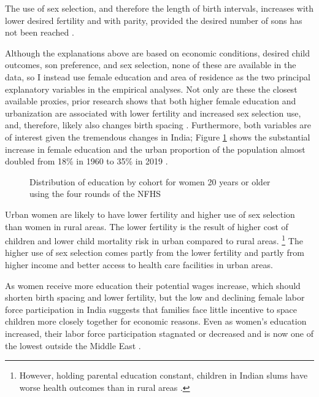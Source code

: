 \documentclass[12pt,letterpaper]{article}
\begin{document}
The use of sex selection, and therefore the length of birth intervals, increases with
lower desired fertility and with parity, provided the desired number of sons has 
not been reached \citep{Portner2015b,Jayachandran2017}.  

Although the explanations above are based on economic conditions, desired child outcomes,
son preference, and sex selection, none of these are available in the data, so I instead 
use female education and area of residence as the two principal explanatory variables in 
the empirical analyses.
Not only are these the closest available proxies, prior research shows that both higher 
female education and urbanization are associated with lower fertility and increased 
sex selection use, and, therefore, likely also changes birth spacing
\citep{das_gupta97,dreze01,bhat03,retherford03b,Guilmoto2009a,Portner2015b,Jayachandran2017}.
Furthermore, both variables are of interest given the tremendous changes in India; 
Figure \ref{fig:education_over_time} shows the substantial increase in female education
and the urban proportion of the population almost doubled from 18\% in 1960 to 35\% in 
2019 \citep{United-Nations2019}.

\begin{figure}[htpb]
\centering
{} 
\caption{Distribution of education by cohort for women 20 years or older
using the four rounds of the NFHS}
\label{fig:education_over_time}
\end{figure}

Urban women are likely to have lower fertility and higher use of sex selection than women 
in rural areas.
The lower fertility is the result of higher cost of children and lower child mortality 
risk in urban compared to rural areas.%
\footnote{
However, holding parental education constant, children in Indian slums have worse
health outcomes than in rural areas \citep{Portner2018a}.
}
The higher use of sex selection comes partly from the lower fertility and partly from
higher income and better access to health care facilities in urban areas.

As women receive more education their potential wages increase, which should shorten 
birth spacing and lower fertility, but the low and declining female labor force 
participation in India suggests that families face little incentive to space children 
more closely together for economic reasons.
Even as women's education increased, their labor force participation stagnated or 
decreased and is now one of the lowest outside the Middle East 
\citep{Klasen2015,Fletcher2017,Afridi2018,Bhargava2018,Chatterjee2018}.
\end{document}
